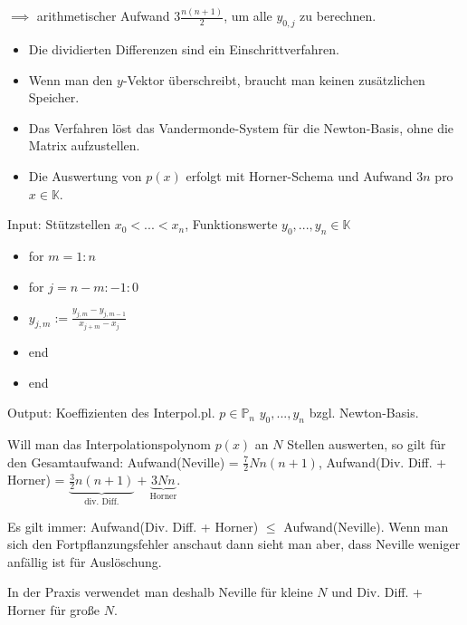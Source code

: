 $\implies$ arithmetischer Aufwand $3 \frac{n(n+1)}{2}$, um alle $y_{0,j}$ zu berechnen.

\begin{remark}
	\begin{itemize}
		\item Die dividierten Differenzen sind ein Einschrittverfahren.
		\item Wenn man den $y$-Vektor überschreibt, braucht man keinen zusätzlichen Speicher.
		\item Das Verfahren löst das Vandermonde-System für die Newton-Basis, ohne die Matrix aufzustellen.
		\item Die Auswertung von $p(x)$ erfolgt mit Horner-Schema und Aufwand $3n$ pro $x \in \mathbb{K}$.
	\end{itemize}
\end{remark}

\begin{algorithm}
	Input: Stützstellen $x_0 < ... < x_n$, Funktionswerte $y_0, ..., y_n \in \mathbb{K}$
	
	\begin{itemize}
		\item for $m=1:n$
		\item \hspace{0.5cm} for $j = n-m:-1:0$
		\item \hspace{1cm} $y_{j,m} := \frac{y_{j,m} - y_{j,m-1}}{x_{j+m} - x_j}$
		\item \hspace{0.5cm} end
		\item end
	\end{itemize}
	
	Output: Koeffizienten des Interpol.pl. $p \in \mathbb{P}_n$ $y_0, ..., y_n$ bzgl. Newton-Basis.
\end{algorithm}

\begin{remark}
	Will man das Interpolationspolynom $p(x)$ an $N$ Stellen auswerten, so gilt für den Gesamtaufwand: Aufwand(Neville) = $\frac{7}{2}Nn(n+1)$, Aufwand(Div. Diff. + Horner) = $\underbrace{\frac{3}{2}n(n+1)}_{\text{div. Diff.}} + \underbrace{3Nn}_{\text{Horner}}$.
	
	Es gilt immer: Aufwand(Div. Diff. + Horner) $\leq$ Aufwand(Neville). Wenn man sich den Fortpflanzungsfehler anschaut dann sieht man aber, dass Neville weniger anfällig ist für Auslöschung.
	
	In der Praxis verwendet man deshalb Neville für kleine $N$ und Div. Diff. + Horner für große $N$.
\end{remark}


